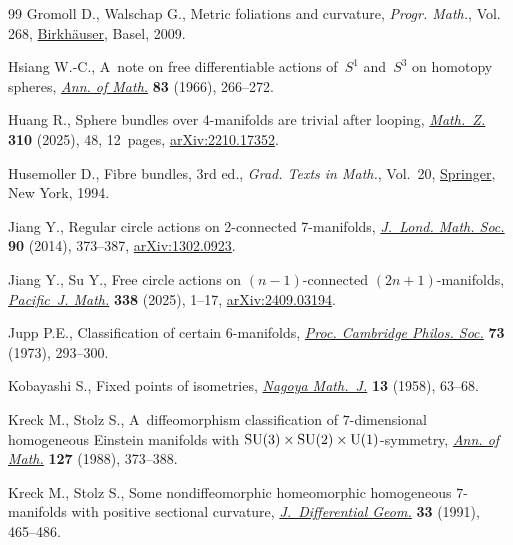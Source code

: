 \documentclass[pdftex]{sigma}
\numberwithin{equation}{section}
\theoremstyle{definition}
\numberwithin{table}{section}
\begin{document}
\begin{thebibliography}{99}
Gromoll D., Walschap G., Metric foliations and curvature, \textit{Progr.
  Math.}, Vol. 268,
  \href{https://doi.org/10.1007/978-3-7643-8715-0}{Birkh\"auser}, Basel, 2009.

Hsiang W.-C., A~note on free differentiable actions of~{$S^1$} and~{$S^{3}$} on
  homotopy spheres, \href{https://doi.org/10.2307/1970431}{\textit{Ann. of
  Math.}} \textbf{83} (1966), 266--272.

Huang R., Sphere bundles over 4-manifolds are trivial after looping,
  \href{https://doi.org/10.1007/s00209-025-03757-z}{\textit{Math.~Z.}}
  \textbf{310} (2025), 48, 12~pages,
  \href{https://arxiv.org/abs/2210.17352}{arXiv:2210.17352}.

Husemoller D., Fibre bundles, 3rd ed., \textit{Grad. Texts in Math.}, Vol.~20,
  \href{https://doi.org/10.1007/978-1-4757-2261-1}{Springer}, New York, 1994.

Jiang Y., Regular circle actions on 2-connected 7-manifolds,
  \href{https://doi.org/10.1112/jlms/jdu028}{\textit{J.~Lond. Math. Soc.}}
  \textbf{90} (2014), 373--387,
  \href{https://arxiv.org/abs/1302.0923}{arXiv:1302.0923}.

Jiang Y., Su Y., Free circle actions on {$(n-1)$}-connected
  {$(2n+1)$}-manifolds,
  \href{https://doi.org/10.2140/pjm.2025.338.1}{\textit{Pacific~J. Math.}}
  \textbf{338} (2025), 1--17,
  \href{https://arxiv.org/abs/2409.03194}{arXiv:2409.03194}.

Jupp P.E., Classification of certain {$6$}-manifolds,
  \href{https://doi.org/10.1017/s0305004100076854}{\textit{Proc. Cambridge
  Philos. Soc.}} \textbf{73} (1973), 293--300.

Kobayashi S., Fixed points of isometries,
  \href{https://doi.org/10.1017/S0027763000023497}{\textit{Nagoya Math.~J.}}
  \textbf{13} (1958), 63--68.

Kreck M., Stolz S., A~diffeomorphism classification of {$7$}-dimensional
  homogeneous {E}instein manifolds with {${\rm SU}(3)\times{\rm
  SU}(2)\times{\rm U}(1)$}-symmetry,
  \href{https://doi.org/10.2307/2007059}{\textit{Ann. of Math.}} \textbf{127}
  (1988), 373--388.

Kreck M., Stolz S., Some nondiffeomorphic homeomorphic homogeneous
  {$7$}-manifolds with positive sectional curvature,
  \href{https://doi.org/10.4310/jdg/1214446327}{\textit{J.~Differential Geom.}}
  \textbf{33} (1991), 465--486.


\end{thebibliography}
\end{document}
